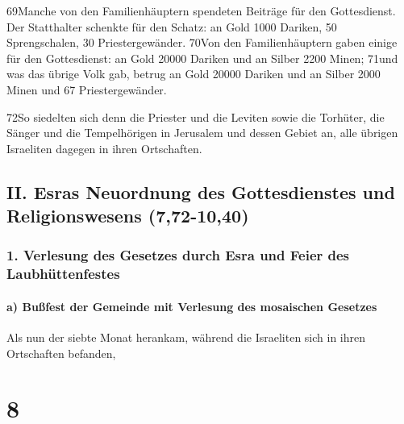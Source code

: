 69Manche von den Familienhäuptern spendeten Beiträge für den
Gottesdienst. Der Statthalter schenkte für den Schatz: an Gold 1000
Dariken, 50 Sprengschalen, 30 Priestergewänder. 70Von den
Familienhäuptern gaben einige für den Gottesdienst: an Gold 20000
Dariken und an Silber 2200 Minen; 71und was das übrige Volk gab, betrug
an Gold 20000 Dariken und an Silber 2000 Minen und 67 Priestergewänder.

72So siedelten sich denn die Priester und die Leviten sowie die
Torhüter, die Sänger und die Tempelhörigen in Jerusalem und dessen
Gebiet an, alle übrigen Israeliten dagegen in ihren Ortschaften.

\hypertarget{ii.-esras-neuordnung-des-gottesdienstes-und-religionswesens-772-1040}{%
\subsection{II. Esras Neuordnung des Gottesdienstes und Religionswesens
(7,72-10,40)}\label{ii.-esras-neuordnung-des-gottesdienstes-und-religionswesens-772-1040}}

\hypertarget{verlesung-des-gesetzes-durch-esra-und-feier-des-laubhuxfcttenfestes}{%
\subsubsection{1. Verlesung des Gesetzes durch Esra und Feier des
Laubhüttenfestes}\label{verlesung-des-gesetzes-durch-esra-und-feier-des-laubhuxfcttenfestes}}

\hypertarget{a-buuxdffest-der-gemeinde-mit-verlesung-des-mosaischen-gesetzes}{%
\paragraph{a) Bußfest der Gemeinde mit Verlesung des mosaischen
Gesetzes}\label{a-buuxdffest-der-gemeinde-mit-verlesung-des-mosaischen-gesetzes}}

Als nun der siebte Monat herankam, während die Israeliten sich in ihren
Ortschaften befanden,

\hypertarget{section-7}{%
\section{8}\label{section-7}}

